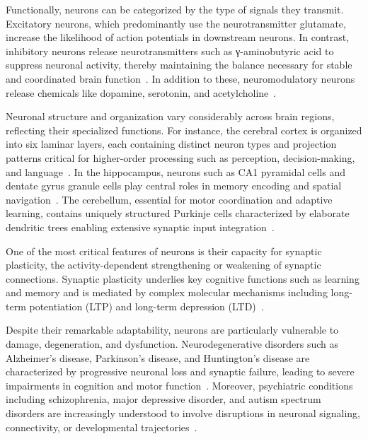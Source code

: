 Functionally, neurons can be categorized by the type of signals they transmit. Excitatory neurons, which predominantly use the neurotransmitter glutamate, increase the likelihood of action potentials in downstream neurons. In contrast, inhibitory neurons release neurotransmitters such as γ-aminobutyric acid to suppress neuronal activity, thereby maintaining the balance necessary for stable and coordinated brain function~\cite{Kandel2013, Markram2004}. In addition to these, neuromodulatory neurons release chemicals like dopamine, serotonin, and acetylcholine~\cite{Kandel2013}. 


Neuronal structure and organization vary considerably across brain regions, reflecting their specialized functions. For instance, the cerebral cortex is organized into six laminar layers, each containing distinct neuron types and projection patterns critical for higher-order processing such as perception, decision-making, and language~\cite{Mountcastle1997}. In the hippocampus, neurons such as CA1 pyramidal cells and dentate gyrus granule cells play central roles in memory encoding and spatial navigation~\cite{Andersen2006}. The cerebellum, essential for motor coordination and adaptive learning, contains uniquely structured Purkinje cells characterized by elaborate dendritic trees enabling extensive synaptic input integration~\cite{Palay1974}.

One of the most critical features of neurons is their capacity for synaptic plasticity, the activity-dependent strengthening or weakening of synaptic connections. Synaptic plasticity underlies key cognitive functions such as learning and memory and is mediated by complex molecular mechanisms including long-term potentiation (LTP) and long-term depression (LTD)~\cite{Citri2008, Bliss1993}.

Despite their remarkable adaptability, neurons are particularly vulnerable to damage, degeneration, and dysfunction. Neurodegenerative disorders such as Alzheimer’s disease, Parkinson’s disease, and Huntington’s disease are characterized by progressive neuronal loss and synaptic failure, leading to severe impairments in cognition and motor function~\cite{DeKosky2004, Surmeier2017}. Moreover, psychiatric conditions including schizophrenia, major depressive disorder, and autism spectrum disorders are increasingly understood to involve disruptions in neuronal signaling, connectivity, or developmental trajectories~\cite{Insel2010, Courchesne2011}.

